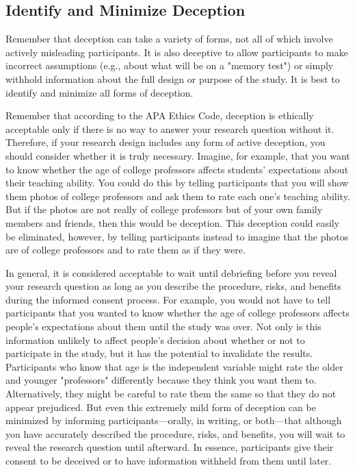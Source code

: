 \subsection{Identify and Minimize Deception}

Remember that deception can take a variety of forms, not all of which involve actively misleading participants. It is also deceptive to allow participants to make incorrect assumptions (e.g., about what will be on a "memory test") or simply withhold information about the full design or purpose of the study. It is best to identify and minimize all forms of deception.

Remember that according to the APA Ethics Code, deception is ethically acceptable only if there is no way to answer your research question without it. Therefore, if your research design includes any form of active deception, you should consider whether it is truly necessary. Imagine, for example, that you want to know whether the age of college professors affects students' expectations about their teaching ability. You could do this by telling participants that you will show them photos of college professors and ask them to rate each one's teaching ability. But if the photos are not really of college professors but of your own family members and friends, then this would be deception. This deception could easily be eliminated, however, by telling participants instead to imagine that the photos are of college professors and to rate them as if they were.

In general, it is considered acceptable to wait until debriefing before you reveal your research question as long as you describe the procedure, risks, and benefits during the informed consent process. For example, you would not have to tell participants that you wanted to know whether the age of college professors affects people's expectations about them until the study was over. Not only is this information unlikely to affect people's decision about whether or not to participate in the study, but it has the potential to invalidate the results. Participants who know that age is the independent variable might rate the older and younger "professors" differently because they think you want them to. Alternatively, they might be careful to rate them the same so that they do not appear prejudiced. But even this extremely mild form of deception can be minimized by informing participants---orally, in writing, or both---that although you have accurately described the procedure, risks, and benefits, you will wait to reveal the research question until afterward. In essence, participants give their consent to be deceived or to have information withheld from them until later.

